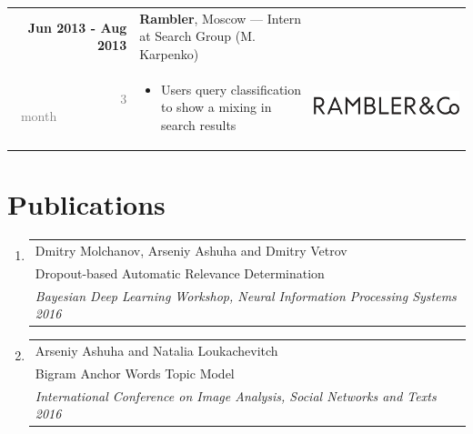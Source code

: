 \documentclass[a4paper,10pt]{article} %
\begin{document}
\begin{tabular}{r|p{11.5cm}c}
\textbf{Jun 2013 - Aug 2013} & \textbf{Rambler}, Moscow --- Intern at Search Group \footnotesize{(M. Karpenko)}\\ 
\textcolor{gray}{3 month}~~~~~~~~~~~& 
\footnotesize{

\vspace{-0.25cm}
\begin{itemize}
	\item Users query classification to show a mixing in search results
\end{itemize}
\vspace{-0.3cm}
}
& \multirow{2}{*}{\includegraphics[scale=0.12]{img/ramblerco}}\\
\end{tabular}

\section{Publications}
\begin{enumerate}
	\item \begin{tabular}{p{18cm}}	
		Dmitry Molchanov, Arseniy Ashuha and Dmitry Vetrov \\
		{Dropout-based Automatic Relevance Determination} \\
		\emph{Bayesian Deep Learning Workshop, Neural Information Processing Systems 2016} 
	\end{tabular}

	\item \begin{tabular}{p{18cm}}	
		Arseniy Ashuha and Natalia Loukachevitch\\
		Bigram Anchor Words Topic Model \\
		\emph{International Conference on Image Analysis, Social Networks and Texts 2016}
	\end{tabular}
\end{enumerate}
\end{document}
